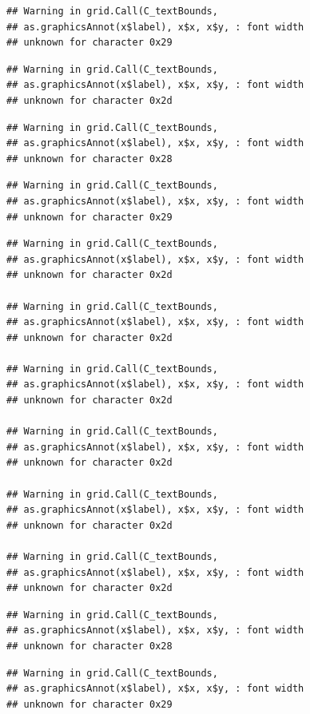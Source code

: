 \documentclass[
]{book}
\begin{document}
\begin{verbatim}
## Warning in grid.Call(C_textBounds,
## as.graphicsAnnot(x$label), x$x, x$y, : font width
## unknown for character 0x29
\end{verbatim}

\begin{verbatim}
## Warning in grid.Call(C_textBounds,
## as.graphicsAnnot(x$label), x$x, x$y, : font width
## unknown for character 0x2d
\end{verbatim}

\begin{verbatim}
## Warning in grid.Call(C_textBounds,
## as.graphicsAnnot(x$label), x$x, x$y, : font width
## unknown for character 0x28
\end{verbatim}

\begin{verbatim}
## Warning in grid.Call(C_textBounds,
## as.graphicsAnnot(x$label), x$x, x$y, : font width
## unknown for character 0x29
\end{verbatim}

\begin{verbatim}
## Warning in grid.Call(C_textBounds,
## as.graphicsAnnot(x$label), x$x, x$y, : font width
## unknown for character 0x2d

## Warning in grid.Call(C_textBounds,
## as.graphicsAnnot(x$label), x$x, x$y, : font width
## unknown for character 0x2d

## Warning in grid.Call(C_textBounds,
## as.graphicsAnnot(x$label), x$x, x$y, : font width
## unknown for character 0x2d

## Warning in grid.Call(C_textBounds,
## as.graphicsAnnot(x$label), x$x, x$y, : font width
## unknown for character 0x2d

## Warning in grid.Call(C_textBounds,
## as.graphicsAnnot(x$label), x$x, x$y, : font width
## unknown for character 0x2d

## Warning in grid.Call(C_textBounds,
## as.graphicsAnnot(x$label), x$x, x$y, : font width
## unknown for character 0x2d
\end{verbatim}

\begin{verbatim}
## Warning in grid.Call(C_textBounds,
## as.graphicsAnnot(x$label), x$x, x$y, : font width
## unknown for character 0x28
\end{verbatim}

\begin{verbatim}
## Warning in grid.Call(C_textBounds,
## as.graphicsAnnot(x$label), x$x, x$y, : font width
## unknown for character 0x29
\end{verbatim}
\end{document}
